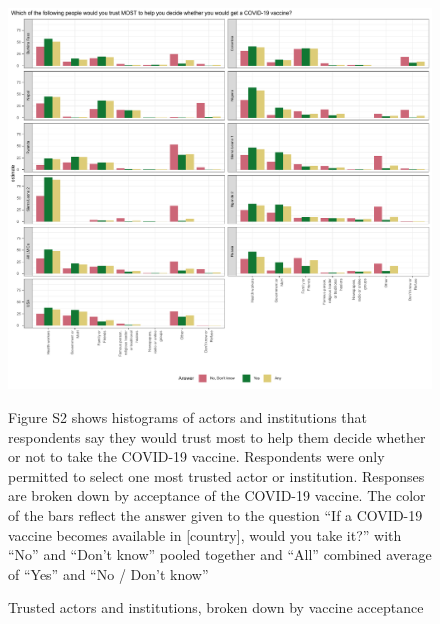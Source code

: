 \documentclass[
  12pt,
]{article}
\begin{document}
\begin{figure}[!ht]
\caption{Trusted actors and institutions, broken down by vaccine acceptance \label{fig:vaccacc}}

\includegraphics{paper_files/figure-latex/histcattrust-1.pdf}

\scriptsize{Figure S2 shows histograms of actors and institutions that respondents say they would trust most to help them decide whether or not to take the COVID-19 vaccine. Respondents were only permitted to select one most trusted  actor or institution. Responses are broken down by acceptance of the COVID-19 vaccine. The color of the bars reflect the answer given to the question ``If a COVID-19 vaccine becomes available in [country], would you take it?'' with ``No'' and ``Don't know'' pooled together and ``All'' combined average of ``Yes'' and ``No / Don't know''}
\end{figure}

\pagebreak
\end{document}
